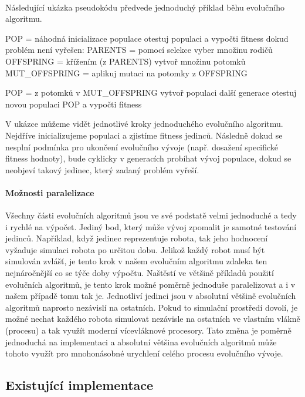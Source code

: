 \paragraph{}
Následující ukázka pseudokódu předvede jednoduchý příklad běhu evolučního
algoritmu. 
\pagebreak
\begin{code}
POP = náhodná inicializace populace
otestuj populaci a vypočti fitness
dokud problém není vyřešen:
    PARENTS = pomocí selekce vyber množinu rodičů
    OFFSPRING = křížením (z PARENTS) vytvoř množinu potomků
    MUT_OFFSPRING = aplikuj mutaci na potomky z OFFSPRING

    POP = z potomků v MUT_OFFSPRING vytvoř populaci další generace
    otestuj novou populaci POP a vypočti fitness
\end{code}

V ukázce můžeme vidět jednotlivé kroky jednoduchého evolučního algoritmu.
Nejdříve inicializujeme populaci a zjistíme fitness jedinců. Následně dokud se
nesplní podmínka pro ukončení evolučního vývoje (např. dosažení specifické
fitness hodnoty), bude cyklicky v generacích probíhat vývoj populace, dokud se
neobjeví takový jedinec, který zadaný problém vyřeší.

\paragraph{Možnosti paralelizace}
Všechny části evolučních algoritmů jsou ve své podstatě velmi jednoduché a tedy
i rychlé na výpočet. Jediný bod, který může vývoj zpomalit je samotné testování
jedinců. Například, když jedinec reprezentuje robota, tak jeho hodnocení
vyžaduje simulaci robota po určitou dobu. Jelikož každý robot musí být
simulován zvlášť, je tento krok v našem evolučním algoritmu zdaleka ten
nejnáročnější co se týče doby výpočtu. Naštěstí ve většině příkladů použití
evolučních algoritmů, je tento krok možné poměrně jednoduše paralelizovat a i v
našem případě tomu tak je. Jednotliví jedinci jsou v absolutní většině
evolučních algoritmů naprosto nezávislí na ostatních. Pokud to simulační
prostředí dovolí, je možné nechat každého robota simulovat nezávisle na
ostatních ve vlastním vlákně (procesu) a tak využít moderní vícevláknové
procesory. Tato změna je poměrně jednoduchá na implementaci a absolutní většina
evolučních algoritmů může tohoto využít pro mnohonásobné urychlení celého
procesu evolučního vývoje.

\subsection{Existující implementace} \label{EA-impl}

